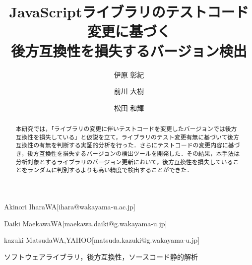 \documentclass[submit]{ipsj}
\begin{document}
\title{JavaScriptライブラリのテストコード変更に基づく\\後方互換性を損失するバージョン検出}





\author{伊原 彰紀}{Akinori Ihara}{WA}[ihara@wakayama-u.ac.jp]
\author{前川 大樹}{Daiki Maekawa}{WA}[maekawa.daiki@g.wakayama-u.jp]
\author{松田 和輝}{kazuki Matsuda}{WA,YAHOO}[matsuda.kazuki@g.wakayama-u.jp]

\begin{abstract}
本研究では，「ライブラリの変更に伴いテストコードを変更したバージョンでは後方互換性を損失している」と仮説を立て，ライブラリのテスト変更有無に基づいて後方互換性の有無を判断する実証的分析を行った．さらにテストコードの変更内容に基づき，後方互換性を損失するバージョンの検出ツールを開発した．その結果，本手法は分析対象とするライブラリのバージョン更新において，後方互換性を損失していることをランダムに判別するよりも高い精度で検出することができた．

\end{abstract}


\begin{jkeyword}
ソフトウェアライブラリ，後方互換性，ソースコード静的解析
\end{jkeyword}
\end{document}
